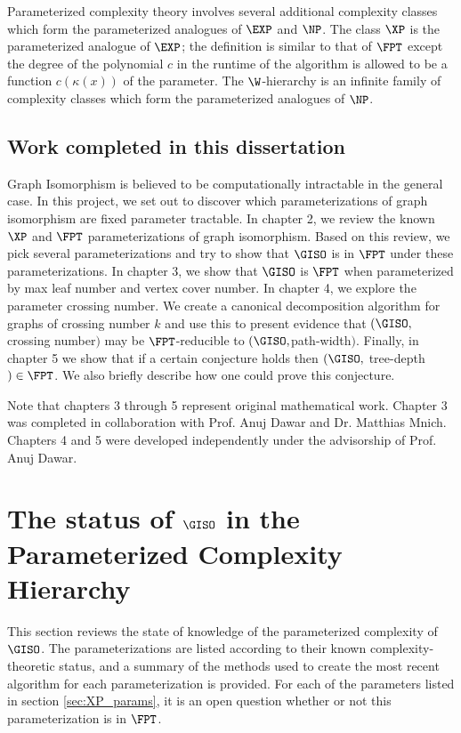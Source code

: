 \documentclass[11pt]{report}
\begin{document}
Parameterized complexity theory involves several additional complexity classes which form the parameterized analogues of $\EXP$ and $\NP$. The class $\XP$ is the parameterized analogue of $\EXP$; the definition is similar to that of $\FPT$ except the degree of the polynomial $c$ in the runtime of the algorithm is allowed to be a function $c(\kappa(x))$ of the parameter.  The $\W$-hierarchy is an infinite family of complexity classes which form the parameterized analogues of $\NP$. 


\section{Work completed in this dissertation}

Graph Isomorphism is believed to be computationally intractable in the general case. In this project, we set out to discover which parameterizations of graph isomorphism are fixed parameter tractable. In chapter 2, we review the known $\XP$ and $\FPT$ parameterizations of graph isomorphism. Based on this review, we pick several parameterizations and try to show that $\GISO$ is in $\FPT$ under these parameterizations. In chapter 3, we show that $\GISO$ is $\FPT$ when parameterized by max leaf number and vertex cover number. In chapter 4, we explore the parameter crossing number. We create a canonical decomposition algorithm for graphs of crossing number $k$ and use this to present evidence that $(\GISO,$ crossing number$)$ may be $\FPT$-reducible to $(\GISO,$path-width$)$. Finally, in chapter 5 we show that if a certain conjecture holds then $(\GISO, $ tree-depth$)\in\FPT$. We also briefly describe how one could prove this conjecture.

Note that chapters 3 through 5 represent original mathematical work. Chapter 3 was completed in collaboration with Prof. Anuj Dawar and Dr. Matthias Mnich. Chapters 4 and 5 were developed independently under the advisorship of Prof. Anuj Dawar. 






\chapter{The status of $\GISO$ in the Parameterized Complexity Hierarchy}


This section reviews the state of knowledge of the parameterized complexity of $\GISO$. The parameterizations are listed according to their known complexity-theoretic status, and a summary of the methods used to create the most recent algorithm for each parameterization is provided. For each of the parameters listed in section \ref{sec:XP_params}, it is an open question whether or not this parameterization is in $\FPT$.
\end{document}
